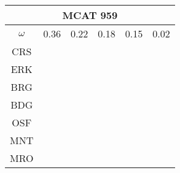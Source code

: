 \documentclass[a4paper,12pt]{article}
\begin{document}
\begin{tabular}{|c|c|c|c|c|c|}%
         \hline \multicolumn{6}{|c|}{MCAT 959} \\ \hline
         $\omega$&0.36&0.22&0.18&0.15&0.02\\ \hline %
        CRS&\cellcolor[HTML]{E41A1C}&\cellcolor[HTML]{E41A1C}&\cellcolor[HTML]{E41A1C}&\cellcolor[HTML]{E41A1C}&\cellcolor[HTML]{E41A1C}\\ \hline %
        ERK&\cellcolor[HTML]{377EB8}&\cellcolor[HTML]{E41A1C}&\cellcolor[HTML]{377EB8}&\cellcolor[HTML]{E41A1C}&\cellcolor[HTML]{E41A1C}\\ \hline %
        BRG&\cellcolor[HTML]{4DAF4A}&\cellcolor[HTML]{E41A1C}&\cellcolor[HTML]{377EB8}&\cellcolor[HTML]{377EB8}&\cellcolor[HTML]{377EB8}\\ \hline %
        BDG&\cellcolor[HTML]{984EA3}&\cellcolor[HTML]{377EB8}&\cellcolor[HTML]{4DAF4A}&\cellcolor[HTML]{4DAF4A}&\cellcolor[HTML]{377EB8}\\ \hline %
        OSF&\cellcolor[HTML]{984EA3}&\cellcolor[HTML]{377EB8}&\cellcolor[HTML]{4DAF4A}&\cellcolor[HTML]{4DAF4A}&\cellcolor[HTML]{4DAF4A}\\ \hline %
        MNT&\cellcolor[HTML]{984EA3}&\cellcolor[HTML]{377EB8}&\cellcolor[HTML]{4DAF4A}&\cellcolor[HTML]{4DAF4A}&\cellcolor[HTML]{4DAF4A}\\ \hline %
        MRO&\cellcolor[HTML]{FF7F00}&\cellcolor[HTML]{4DAF4A}&\cellcolor[HTML]{984EA3}&\cellcolor[HTML]{984EA3}&\cellcolor[HTML]{4DAF4A}\\ \hline %

\end{tabular}
\end{document}
